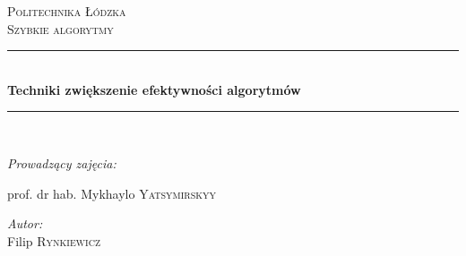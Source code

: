 \pgfplotsset{compat=newest} %




\begin{titlepage}

\newcommand{\HRule}{\rule{\linewidth}{0.5mm}} %

\center %
 

\textsc{\LARGE Politechnika Łódzka}\\[1.5cm] %
\textsc{\Large Szybkie algorytmy}\\[0.5cm] %


\HRule \\[0.4cm]
{ \huge \bfseries Techniki zwiększenie efektywności algorytmów }\\[0.4cm] %
\HRule \\[1.5cm]
 



\begin{flushleft}\large

\begin{center} \emph{Prowadzący zajęcia:} \end{center}
\begin{center}
prof. dr hab. Mykhaylo \textsc{Yatsymirskyy}
\end{center} %
\end{flushleft}


\Large \emph{Autor:}\\
Filip \textsc{Rynkiewicz}\\[2cm] %



\end{titlepage}
